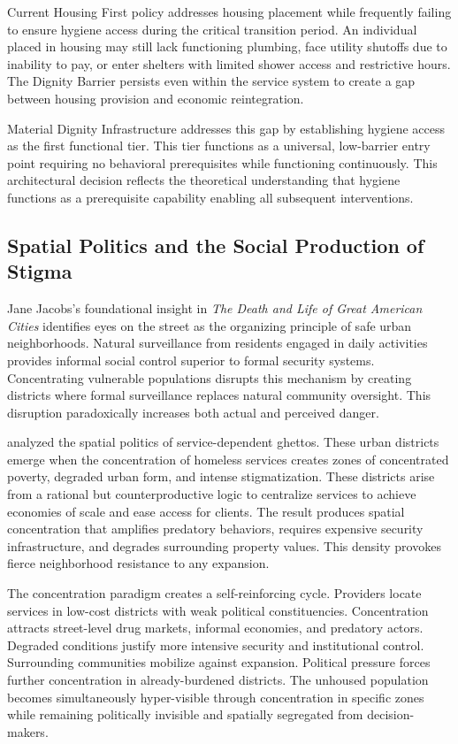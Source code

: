 \documentclass[12pt, letterpaper]{article}
\begin{document}
Current Housing First policy addresses housing placement while frequently failing to ensure hygiene access during the critical transition period. An individual placed in housing may still lack functioning plumbing, face utility shutoffs due to inability to pay, or enter shelters with limited shower access and restrictive hours. The Dignity Barrier persists even within the service system to create a gap between housing provision and economic reintegration.

Material Dignity Infrastructure addresses this gap by establishing hygiene access as the first functional tier. This tier functions as a universal, low-barrier entry point requiring no behavioral prerequisites while functioning continuously. This architectural decision reflects the theoretical understanding that hygiene functions as a prerequisite capability enabling all subsequent interventions.

\subsection{Spatial Politics and the Social Production of Stigma}

Jane Jacobs's foundational insight in \emph{The Death and Life of Great American Cities} \citeyearpar{jacobs_1961} identifies eyes on the street as the organizing principle of safe urban neighborhoods. Natural surveillance from residents engaged in daily activities provides informal social control superior to formal security systems. Concentrating vulnerable populations disrupts this mechanism by creating districts where formal surveillance replaces natural community oversight. This disruption paradoxically increases both actual and perceived danger.

\citet{dear_wolch_1987} analyzed the spatial politics of service-dependent ghettos. These urban districts emerge when the concentration of homeless services creates zones of concentrated poverty, degraded urban form, and intense stigmatization. These districts arise from a rational but counterproductive logic to centralize services to achieve economies of scale and ease access for clients. The result produces spatial concentration that amplifies predatory behaviors, requires expensive security infrastructure, and degrades surrounding property values. This density provokes fierce neighborhood resistance to any expansion.

The concentration paradigm creates a self-reinforcing cycle. Providers locate services in low-cost districts with weak political constituencies. Concentration attracts street-level drug markets, informal economies, and predatory actors. Degraded conditions justify more intensive security and institutional control. Surrounding communities mobilize against expansion. Political pressure forces further concentration in already-burdened districts. The unhoused population becomes simultaneously hyper-visible through concentration in specific zones while remaining politically invisible and spatially segregated from decision-makers.
\end{document}
